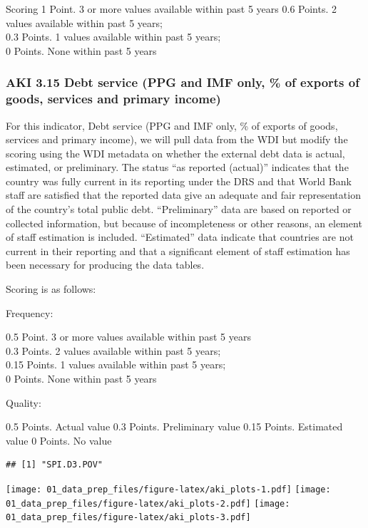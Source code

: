 \documentclass[]{article}
\begin{document}
Scoring 1 Point. 3 or more values available within past 5 years 0.6
Points. 2 values available within past 5 years;\\
0.3 Points. 1 values available within past 5 years;\\
0 Points. None within past 5 years

\hypertarget{aki-3.15-debt-service-ppg-and-imf-only-of-exports-of-goods-services-and-primary-income}{%
\subsubsection{AKI 3.15 Debt service (PPG and IMF only, \% of exports of
goods, services and primary
income)}\label{aki-3.15-debt-service-ppg-and-imf-only-of-exports-of-goods-services-and-primary-income}}

For this indicator, Debt service (PPG and IMF only, \% of exports of
goods, services and primary income), we will pull data from the WDI but
modify the scoring using the WDI metadata on whether the external debt
data is actual, estimated, or preliminary. The status ``as reported
(actual)'' indicates that the country was fully current in its reporting
under the DRS and that World Bank staff are satisfied that the reported
data give an adequate and fair representation of the country's total
public debt. ``Preliminary'' data are based on reported or collected
information, but because of incompleteness or other reasons, an element
of staff estimation is included. ``Estimated'' data indicate that
countries are not current in their reporting and that a significant
element of staff estimation has been necessary for producing the data
tables.

Scoring is as follows:

Frequency:

0.5 Point. 3 or more values available within past 5 years\\
0.3 Points. 2 values available within past 5 years;\\
0.15 Points. 1 values available within past 5 years;\\
0 Points. None within past 5 years

Quality:

0.5 Points. Actual value 0.3 Points. Preliminary value 0.15 Points.
Estimated value 0 Points. No value

\begin{verbatim}
## [1] "SPI.D3.POV"
\end{verbatim}

\texttt{[image: 01\_data\_prep\_files/figure-latex/aki\_plots-1.pdf]}
\texttt{[image: 01\_data\_prep\_files/figure-latex/aki\_plots-2.pdf]}
\texttt{[image: 01\_data\_prep\_files/figure-latex/aki\_plots-3.pdf]}
\end{document}
